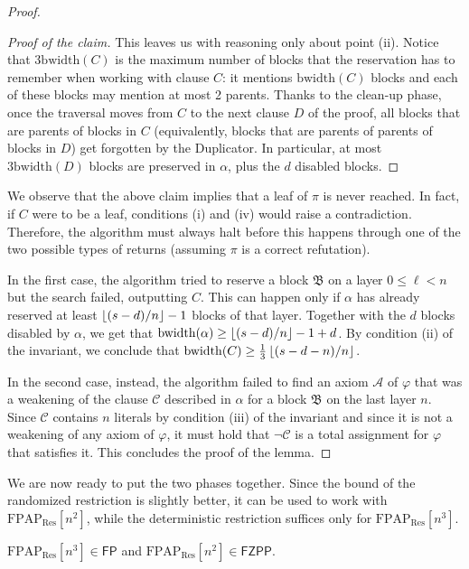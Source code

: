 \begin{proof}
\begin{proof}[Proof of the claim]
        This leaves us with reasoning only about point (ii). Notice that $3 \mathrm{bwidth}(C)$ is the maximum number of blocks that the reservation has to remember when working with clause $C$: it mentions $\mathrm{bwidth}(C)$ blocks and each of these blocks may mention at most 2 parents. Thanks to the clean-up phase, once the traversal moves from $C$ to the next clause $D$ of the proof, all blocks that are parents of blocks in $C$ (equivalently, blocks that are parents of parents of blocks in $D$) get forgotten by the Duplicator. In particular, at most $3 \mathrm{bwidth}(D)$ blocks are preserved in $\alpha$, plus the $d$ disabled blocks.
    \end{proof}

    We observe that the above claim implies that a leaf of $\pi$ is never reached. In fact, if $C$ were to be a leaf, conditions (i) and (iv) would raise a contradiction. Therefore, the algorithm must always halt before this happens through one of the two possible types of returns (assuming $\pi$ is a correct refutation).

    In the first case, the algorithm tried to reserve a block $\mathfrak{B}$ on a layer $0 \leq \ell < n$ but the search failed, outputting $C$. This can happen only if $\alpha$ has already reserved at least $\left \lfloor (s-d)/n \right \rfloor-1$ blocks of that layer. Together with the $d$ blocks disabled by $\alpha$, we get that $\mathrm{bwidth}(\alpha) \geq \left \lfloor (s-d)/n \right \rfloor-1 + d$. By condition (ii) of the invariant, we conclude that $\mathrm{bwidth}(C) \geq \frac{1}{3} \left \lfloor (s-d-n)/n \right \rfloor$.

    In the second case, instead, the algorithm failed to find an axiom $\mathscr{A}$ of $\varphi$ that was a weakening of the clause $\mathscr{C}$ described in $\alpha$ for a block $\mathfrak{B}$ on the last layer $n$. Since $\mathscr{C}$ contains $n$ literals by condition (iii) of the invariant and since it is not a weakening of any axiom of $\varphi$, it must hold that $\lnot \mathscr{C}$ is a total assignment for $\varphi$ that satisfies it. This concludes the proof of the lemma.
\end{proof}

We are now ready to put the two phases together. Since the bound of the randomized restriction is slightly better, it can be used to work with $\mathrm{FPAP}_{\mathrm{Res}}[n^2]$, while the deterministic restriction suffices only for $\mathrm{FPAP}_{\mathrm{Res}}[n^3]$.

\begin{theorem}
    \label{thm:fpap_res}
    $\mathrm{FPAP}_{\mathrm{Res}}[n^3] \in \mathsf{FP}$ and $\mathrm{FPAP}_{\mathrm{Res}}[n^2] \in \mathsf{FZPP}$.
\end{theorem}

